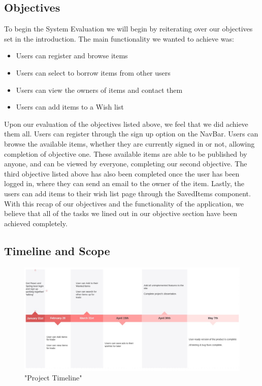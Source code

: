 \subsection{Objectives}
To begin the System Evaluation we will begin by reiterating over our objectives set in the introduction. The main functionality we wanted to achieve was:
\begin{itemize}
    \item Users can register and browse items
    \item Users can select to borrow items from other users
    \item Users can view the owners of items and contact them
    \item Users can add items to a Wish list
\end{itemize}
\par Upon our evaluation of the objectives listed above, we feel that we did achieve them all. Users can register through the sign up option on the NavBar. Users can browse the available items, whether they are currently signed in or not, allowing completion of objective one. These available items are able to be published by anyone, and can be viewed by everyone, completing our second objective. The third objective listed above has also been completed once the user has been logged in, where they can send an email to the owner of the item. Lastly, the users can add items to their wish list page through the SavedItems component. With this recap of our objectives and the functionality of the application, we believe that all of the tasks we lined out in our objective section have been achieved completely. \par

\subsection{Timeline and Scope}
\begin{figure}[h]
\renewcommand\thefigure{4.7}
\centering
\includegraphics[scale=0.4]{img/timeline.png}
\caption{"Project Timeline"}
\label{Timeline}
\end{figure}

